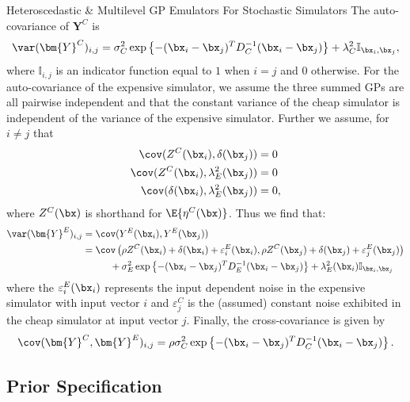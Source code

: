 \begin{chapter}{Heteroscedastic \& Multilevel GP Emulators For Stochastic Simulators\label{Ch:Hetsml}}
The auto-covariance of $\bm{Y}^C$ is
\begin{equation*}
\var(\bm{Y}^C)_{i,j} = \sigma^2_C \exp \left\{ -(\bx_i - \bx_j)^T D^{-1}_C (\bx_i - \bx_j)\right\} + \lambda_C^2 \mathbb{I}_{\bx_i, \bx_j},\nonumber
\end{equation*}
\noindent where $\mathbb{I}_{i, j}$ is an indicator function equal to $1$ when $i=j$ and $0$ otherwise. For the auto-covariance of the expensive simulator, we assume the three summed GPs are all pairwise independent and that the constant variance of the cheap simulator is independent of the variance of the expensive simulator. Further we assume, for $i \neq j$ that
\begin{align*}
\cov(Z^C(\bx_i), \delta(\bx_j)) &= 0\nonumber \\
\cov(Z^C(\bx_i), \lambda^2_E(\bx_j)) &= 0\nonumber \\
\cov(\delta(\bx_i), \lambda^2_E(\bx_j)) &= 0,\nonumber
\end{align*}
where $Z^C(\bx)$ is shorthand for $\E\{ \eta^C(\bx) \}$. Thus we find that:
\begin{align*}
\var(\bm{Y}^E)_{i,j} & = \cov(Y^E(\bx_i), Y^E(\bx_j))\nonumber\\
 & = \cov\left( \rho Z^C(\bx_i) + \delta(\bx_i) + \varepsilon^E_i(\bx_i), \rho Z^C(\bx_j) + \delta(\bx_j) + \varepsilon^E_j(\bx_j)\right) \nonumber\\
& \hspace{1cm} + \sigma_E^2 \exp\left\{ -(\bx_i - \bx_j)^T D^{-1}_E (\bx_i - \bx_j) \right\}  + \lambda^2_E(\bx_i)\mathbb{I}_{\bx_i, \bx_j}\nonumber
\end{align*}
where the $\varepsilon^E_i(\bx_i)$ represents the input dependent noise in the expensive simulator with input vector $i$ and $\varepsilon^C_j$ is the (assumed) constant noise exhibited in the cheap simulator at input vector $j$. Finally, the cross-covariance is given by
\begin{equation*}
\cov(\bm{Y}^C, \bm{Y}^E)_{i,j}  = \rho \sigma^2_C \exp \left\{ -(\bx_i - \bx_j)^T D^{-1}_C (\bx_i - \bx_j)\right\}.
\end{equation*}
\subsection{Prior Specification}



\end{chapter}
